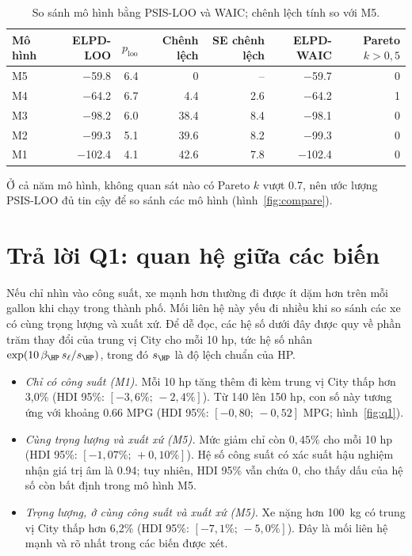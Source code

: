 \documentclass[12pt,a4paper]{report}
\begin{document}
\begin{table}[tp]
  \centering
  \caption{So sánh mô hình bằng PSIS-LOO và WAIC; chênh lệch tính so với M5.}
  \label{tab:compare}
  \begin{tabular}{lrrrrrr}
    \toprule
    Mô hình & ELPD-LOO & $p_{\text{loo}}$ & Chênh lệch & SE chênh lệch & ELPD-WAIC & Pareto $k > 0{,}5$ \\
    \midrule
    M5 & \num{-59.8}  & \num{6.4} & 0           & --         & \num{-59.7}  & 0 \\
    M4 & \num{-64.2}  & \num{6.7} & \num{4.4}   & \num{2.6}  & \num{-64.2}  & 1 \\
    M3 & \num{-98.2}  & \num{6.0} & \num{38.4}  & \num{8.4}  & \num{-98.1}  & 0 \\
    M2 & \num{-99.3}  & \num{5.1} & \num{39.6}  & \num{8.2}  & \num{-99.3}  & 0 \\
    M1 & \num{-102.4} & \num{4.1} & \num{42.6}  & \num{7.8}  & \num{-102.4} & 0 \\
    \bottomrule
  \end{tabular}
\end{table}

Ở cả năm mô hình, không quan sát nào có Pareto $k$ vượt \num{0.7}, nên ước
lượng PSIS-LOO đủ tin cậy để so sánh các mô hình (hình~\ref{fig:compare}).


\section{Trả lời Q1: quan hệ giữa các biến}
\label{sec:q1}

Nếu chỉ nhìn vào công suất, xe mạnh hơn thường đi được ít dặm hơn trên mỗi
gallon khi chạy trong thành phố. Mối liên hệ này yếu đi nhiều khi so sánh các xe
có cùng trọng lượng và xuất xứ. Để dễ đọc, các hệ số dưới đây được quy về phần
trăm thay đổi của trung vị City cho mỗi 10 hp, tức hệ số nhân
$\exp(10\, \beta_{\HP}\, s_\ell / s_{\HP})$, trong đó $s_{\HP}$ là độ lệch chuẩn
của HP.

\begin{itemize}
  \item \emph{Chỉ có công suất (M1).} Mỗi 10 hp tăng thêm đi kèm trung vị City
    thấp hơn 3{,}0\% (HDI 95\%: $[-3{,}6\%;\, -2{,}4\%]$). Từ 140 lên 150 hp,
    con số này tương ứng với khoảng \num{0.66} MPG (HDI 95\%:
    $[-0{,}80;\, -0{,}52]$ MPG; hình~\ref{fig:q1}).
  \item \emph{Cùng trọng lượng và xuất xứ (M5).} Mức giảm chỉ còn
    $0{,}45\%$ cho mỗi 10 hp (HDI 95\%: $[-1{,}07\%;\, +0{,}10\%]$). Hệ số
    công suất có xác suất hậu nghiệm nhận giá trị âm là \num{0.94}; tuy nhiên,
    HDI 95\% vẫn chứa 0, cho thấy dấu của hệ số còn bất định trong mô hình M5.
  \item \emph{Trọng lượng, ở cùng công suất và xuất xứ (M5).} Xe nặng hơn
    \SI{100}{kg} có trung vị City thấp hơn 6{,}2\% (HDI 95\%:
    $[-7{,}1\%;\, -5{,}0\%]$). Đây là mối liên hệ mạnh và rõ nhất trong các biến được xét.
\end{itemize}
\end{document}
